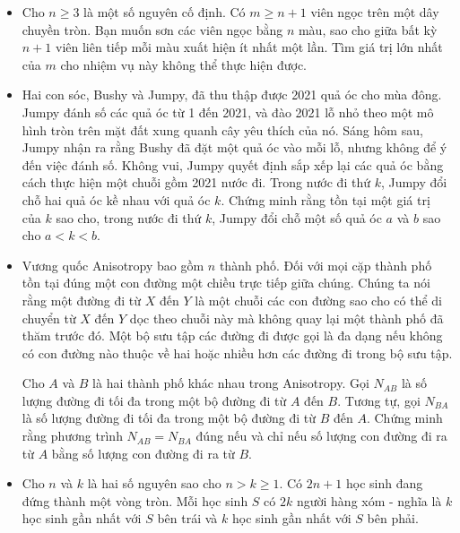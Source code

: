 \documentclass[11pt]{scrartcl}
\begin{document}
\begin{itemize}[label=, leftmargin=0em, itemsep=-0em]
    \item \begin{btvn}
        Cho $n\ge 3$ là một số nguyên cố định. Có $m\ge n+1$ viên ngọc trên một dây chuyền tròn. Bạn muốn sơn các viên ngọc bằng $n$ màu, sao cho giữa bất kỳ $n+1$ viên liên tiếp mỗi màu xuất hiện ít nhất một lần. Tìm giá trị lớn nhất của $m$ cho nhiệm vụ này không thể thực hiện được.

    \end{btvn}

    \item \begin{btvn}
        Hai con sóc, Bushy và Jumpy, đã thu thập được 2021 quả óc cho mùa đông. Jumpy đánh số các quả óc từ 1 đến 2021, và đào 2021 lỗ nhỏ theo một mô hình tròn trên mặt đất xung quanh cây yêu thích của nó. Sáng hôm sau, Jumpy nhận ra rằng Bushy đã đặt một quả óc vào mỗi lỗ, nhưng không để ý đến việc đánh số. Không vui, Jumpy quyết định sắp xếp lại các quả óc bằng cách thực hiện một chuỗi gồm 2021 nước đi. Trong nước đi thứ $k$, Jumpy đổi chỗ hai quả óc kề nhau với quả óc $k$.
        Chứng minh rằng tồn tại một giá trị của $k$ sao cho, trong nước đi thứ $k$, Jumpy đổi chỗ một số quả óc $a$ và $b$ sao cho $a<k<b$.
    \end{btvn}

    \item \begin{btvn}
        Vương quốc Anisotropy bao gồm $n$ thành phố. Đối với mọi cặp thành phố tồn tại đúng một con đường một chiều trực tiếp giữa chúng. Chúng ta nói rằng một đường đi từ $X$ đến $Y$ là một chuỗi các con đường sao cho có thể di chuyển từ $X$ đến $Y$ dọc theo chuỗi này mà không quay lại một thành phố đã thăm trước đó. Một bộ sưu tập các đường đi được gọi là đa dạng nếu không có con đường nào thuộc về hai hoặc nhiều hơn các đường đi trong bộ sưu tập.

       Cho $A$ và $B$ là hai thành phố khác nhau trong Anisotropy. Gọi $N_{AB}$ là số lượng đường đi tối đa trong một bộ đường đi từ $A$ đến $B$. Tương tự, gọi $N_{BA}$ là số lượng đường đi tối đa trong một bộ đường đi từ $B$ đến $A$. Chứng minh rằng phương trình $N_{AB} = N_{BA}$ đúng nếu và chỉ nếu số lượng con đường đi ra từ $A$ bằng số lượng con đường đi ra từ $B$.
    \end{btvn}

    \item \begin{btvn}
        Cho $n$ và $k$ là hai số nguyên sao cho $n>k\geqslant 1$. Có $2n+1$ học sinh đang đứng thành một vòng tròn. Mỗi học sinh $S$ có $2k$ người hàng xóm - nghĩa là $k$ học sinh gần nhất với $S$ bên trái và $k$ học sinh gần nhất với $S$ bên phải.


\end{btvn}
\end{itemize}
\end{document}
